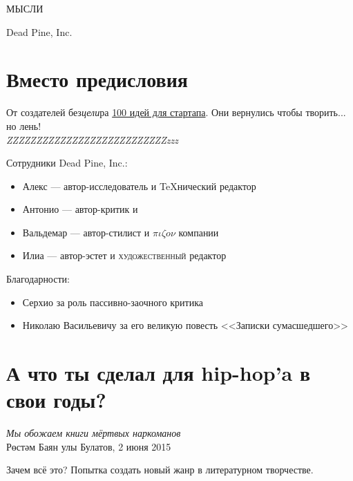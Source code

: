 \documentclass{ideas}
\renewcommand{\author}{Dead Pine, Inc.}
\begin{document}
\begin{titlepage}

\vspace*{\fill}
\begin{center}
{\selectfont\Huge МЫСЛИ}    
\end{center}
\vspace*{\fill}
\begin{center}
\author\\\the\year
\end{center}
\end{titlepage}
\section*{Вместо предисловия}
\vspace*{\fill}
    От создателей без\emph{цели}ра \href{https://antoniii.github.io/}{100 идей для стартапа}.
    Они вернулись чтобы творить... но лень!\\

    \emph{\Huge{ZZZ}\LARGE{ZZZ}\Large{ZZZ}\large{ZZZ}ZZZ\small{ZZZ}\footnotesize{ZZZ}\scriptsize{ZZZ}\tiny{ZZZ}\tiny{zzz}}

\vfill
\begin{center}
Сотрудники \author:
  \begin{itemize}
    \item Алекс ---  автор-исследователь и {\TeX}нический редактор
    \item Антонио --- автор-критик и 
    \item Вальдемар --- автор-стилист и \( \pi\iota\zeta o \nu \) компании
    \item Илиа --- автор-эстет и {\selectfont\scshape художественный} редактор
  \end{itemize}

\vfill
Благодарности:
  \begin{itemize}
    \item Серхио за роль пассивно-заочного критика
    \item Николаю Васильевичу за его великую повесть <<Записки сумасшедшего>>
  \end{itemize}
\end{center}
\vfill
\newpage
\section*{А что ты сделал для hip-hop'a в свои годы?}\label{section:one}
\begin{displayquote}
\begin{flushright}
    \emph{Мы обожаем книги мёртвых наркоманов}\\
    Рөстәм Баян улы Булатов, 2 июня 2015
\end{flushright}
\end{displayquote}
Зачем всё это? Попытка создать новый жанр в литературном творчестве.
\end{document}
